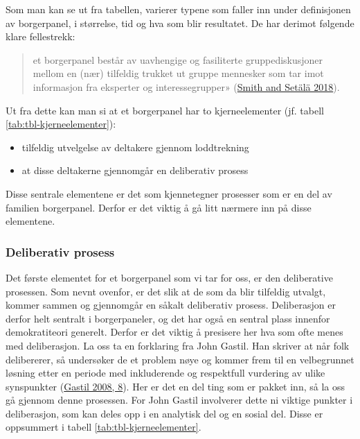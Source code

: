 \documentclass[
  12pt,
  a4paper, 12pt]{article}
\providecommand{\tightlist}{%
  \setlength{\itemsep}{0pt}\setlength{\parskip}{0pt}}
\begin{document}
Som man kan se ut fra tabellen, varierer typene som faller inn under definisjonen av borgerpanel, i størrelse, tid og hva som blir resultatet. De har derimot følgende klare fellestrekk:

\begin{quote}
et borgerpanel består av uavhengige og fasiliterte gruppediskusjoner mellom en (nær) tilfeldig trukket ut gruppe mennesker som tar imot informasjon fra eksperter og interessegrupper» (\protect\hyperlink{ref-smith_mini-publics_2018}{Smith and Setälä 2018}).
\end{quote}

Ut fra dette kan man si at et borgerpanel har to kjerneelementer (jf. tabell \ref{tab:tbl-kjerneelementer}):

\begin{itemize}
\tightlist
\item
  tilfeldig utvelgelse av deltakere gjennom loddtrekning\\
\item
  at disse deltakerne gjennomgår en deliberativ prosess
\end{itemize}

Disse sentrale elementene er det som kjennetegner prosesser som er en del av familien borgerpanel. Derfor er det viktig å gå litt nærmere inn på disse elementene.

\hypertarget{deliberativ-prosess}{%
\subsubsection{Deliberativ prosess}\label{deliberativ-prosess}}

Det første elementet for et borgerpanel som vi tar for oss, er den deliberative prosessen. Som nevnt ovenfor, er det slik at de som da blir tilfeldig utvalgt, kommer sammen og gjennomgår en såkalt deliberativ prosess. Deliberasjon er derfor helt sentralt i borgerpaneler, og det har også en sentral plass innenfor demokratiteori generelt. Derfor er det viktig å presisere her hva som ofte menes med deliberasjon.
La oss ta en forklaring fra John Gastil. Han skriver at når folk delibererer, så undersøker de et problem nøye og kommer frem til en velbegrunnet løsning etter en periode med inkluderende og respektfull vurdering av ulike synspunkter (\protect\hyperlink{ref-gastil_political_2008}{Gastil 2008, 8}). Her er det en del ting som er pakket inn, så la oss gå gjennom denne prosessen. For John Gastil involverer dette ni viktige punkter i deliberasjon, som kan deles opp i en analytisk del og en sosial del. Disse er oppsummert i tabell \ref{tab:tbl-kjerneelementer}.
\end{document}
